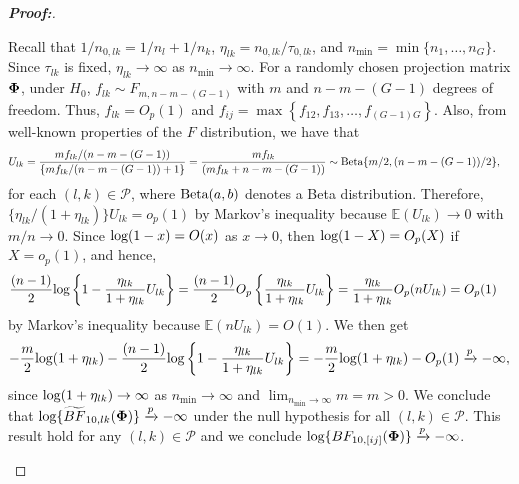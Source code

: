 \documentclass[alpha-refs]{wiley-article}
\theoremstyle{plain}%
\theoremstyle{definition}
\def\log{\hbox{log}}
\def\Beta{\hbox{Beta}}
\def\log{\hbox{log}}
\def\Beta{\hbox{Beta}}
\def\bse{\begin{eqnarray*}}
\def\ese{\end{eqnarray*}}
\newcommand{\uPhi}              {\mbox{\boldmath$\Phi$}}
\newcommand{\rsz}[1]{\textcolor{red}{#1}}
\begin{document}
\begin{proof}[\textbf{\upshape Proof:}]
\begin{description}
Recall that $1/n_{0,lk} = 1/n_l + 1/n_k$, $\eta_{lk} = n_{0,lk}/\tau_{0,lk}$, and $n_{\min} = \min\{n_1, \ldots, n_G\}$.
Since $\tau_{lk}$ is fixed, $\eta_{lk} \rightarrow \infty$ as $n_{\min} \to \infty$.
For a randomly chosen projection matrix $\uPhi$, under $H_{0}$, $f_{lk}  \sim F_{m, n-m-(G-1)}$ with $m$ and $n - m -(G-1)$ degrees of freedom.
Thus, $f_{lk} = O_{p}(1)$ and $f_{ij} = \max\left\{f_{12}, f_{13}, \ldots, f_{(G-1)G} \right\}$.
Also, from well-known properties of the $F$ distribution, we have that
\begin{align*}
U_{lk} & = \frac{m f_{lk}/(n-m-(G-1) )}{\{m f_{lk}/(n-m- (G-1) ) + 1\}} 
  =\frac{m f_{lk}}{( m f_{lk} +n-m- (G-1))} \sim \Beta\{m/2, (n-m-(G-1))/2 \},
\end{align*}
for each {$(l, k)\in\mathcal{P}$}, where $\Beta(a, b)$ denotes a Beta distribution.
Therefore, $\{\eta_{lk}/(1 + \eta_{lk})\} U_{lk} = o_{p}(1)$ by Markov's inequality because $\mathbb{E}(U_{lk}) \to 0$ with $m/n\to 0$.
Since $\log(1 - x) = O(x)$ as $x\to 0$, then $\log(1 - X) = O_p(X)$ if $X = o_p(1)$, and hence,
\begin{align*}
    \frac{(n - 1)}{2}\log\left\{1 - \frac{\eta_{lk}}{1 + \eta_{lk}}U_{lk}\right\}
    & = \frac{(n - 1)}{2}O_p\left\{\frac{\eta_{lk}}{1 + \eta_{lk}}U_{lk}\right\} = \frac{\eta_{lk}}{1 + \eta_{lk}}O_p(nU_{lk}) = O_p(1)
\end{align*}
by Markov's inequality because $\mathbb{E}(nU_{lk}) = O(1)$. 
We then get
\bse
-\frac{m}{2}\log(1 + \eta_{lk}) -\frac{(n-1)}{2}\log\left\{1 - \frac{\eta_{lk}}{1 + \eta_{lk}}U_{lk}\right\}
= -\frac{m}{2}\log(1 + \eta_{lk}) - O_p(1) \xrightarrow[]{p} -\infty,
\ese
since $\log(1 + \eta_{lk}) \rightarrow \infty$ as $n_{\min} \rightarrow \infty$ and $\lim_{n_{\min} \rightarrow \infty} m = m > 0$.
We conclude that $\log\{\widetilde{BF}_{10,lk}(\uPhi)\} \xrightarrow[]{p} -\infty$ under the null hypothesis for all $(l, k)\in\mathcal{P}$.
This result hold for any $(l,k) \in \mathcal{P}$ and we conclude $\log\{BF_{10,[ij]}(\uPhi)\} \xrightarrow[]{p} -\infty$. 


\end{description}
\end{proof}
\end{document}
